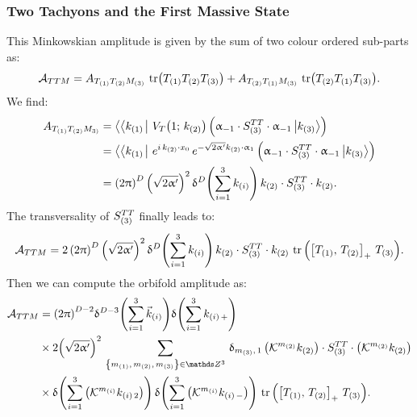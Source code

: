 \subsubsection{Two Tachyons and the First Massive State}

This Minkowskian amplitude is given by the sum of two colour ordered sub-parts as:
\begin{equation}
  \mathcal{A}_{TTM}
  =
  A_{T_{\qty(1)} T_{\qty(2)} M_{\qty(3)}}\,
  \tr(T_{\qty(1)} T_{\qty(2)} T_{\qty(3)})
  +
  A_{T_{\qty(2)} T_{\qty(1)} M_{\qty(3)}}\,
  \tr(T_{\qty(2)} T_{\qty(1)} T_{\qty(3)}).
\end{equation}
We find:
\begin{equation}
  \begin{split}
    A_{T_{\qty(1)} T_{\qty(2)} M_{3)}}
    & =
    \left\langle\left\langle k_{\qty(1)} \right.\right|\,
    V_T\qty(1;\, k_{\qty(2)})\,
    \qty(%
      \alpha_{-1} \cdot S_{\qty(3)}^{TT} \cdot \alpha_{-1} \ket{k_{\qty(3)}}
    )
    \\
    & =
    \left\langle\left\langle k_{\qty(1)} \right.\right|\,
    e^{i\, k_{\qty(2)} \cdot x_0}\,
    e^{-\sqrt{2 \ap} k_{\qty(2)} \cdot \alpha_{1}}\,
    \qty(%
      \alpha_{-1} \cdot S_{\qty(3)}^{TT} \cdot \alpha_{-1} \ket{k_{\qty(3)}}
    )
    \\
    & =
    \qty(2\pi)^D\,
    \qty(\sqrt{2 \ap})^2\,
    \delta^D\qty(\finitesum{i}{1}{3} k_{\qty(i)} )\,
    k_{\qty(2)} \cdot S_{\qty(3)}^{TT} \cdot k_{\qty(2)}.
  \end{split}
\end{equation}
The transversality of $S_{\qty(3)}^{TT}$ finally leads to:
\begin{equation}
  \mathcal{A}_{TTM}
  =
  2\,
  \qty(2\uppi)^D\,
  \qty(\sqrt{2 \upalpha'})^2\,
  \updelta^D\qty( \sum\limits_{i = 1}^{3} k_{\qty(i)} )\,
  k_{\qty(2)} \cdot S_{\qty(3)}^{TT} \cdot k_{\qty(2)}\,
  \tr\qty( \left[ T_{\qty(1)},\, T_{\qty(2)} \right]_+\, T_{\qty(3)} ).
\end{equation}
Then we can compute the orbifold amplitude as:
\begin{equation}
  \begin{split}
    \cA_{TTM}
    & =
    \qty(2\pi)^{D-2}
    \delta^{D-3}\qty( \finitesum{i}{1}{3} \vec{k}_{\qty(i)} )
    \delta\qty( \finitesum{i}{1}{3} k_{\qty(i)\, +} )
    \\
    & \times
    2 \qty(\sqrt{2 \ap})^2\,
    \sum_{ \qty{m_{\qty(1)},\, m_{\qty(2)},\, m_{\qty(3)}} \in \Z^3 }\,
    \delta_{m_{\qty(3)},\, 1}\,
    \qty(\cK^{m_{\qty(2)}} k_{\qty(2)})
    \cdot
    S_{\qty(3)}^{TT}
    \cdot
    \qty(\cK^{m_{\qty(2)}} k_{\qty(2)})
    \\
    & \times
    \delta\qty( \finitesum{i}{1}{3} \qty(\cK^{m_{\qty(i)}} k_{\qty(i)\, 2}) )\,
    \delta\qty( \finitesum{i}{1}{3} \qty(\cK^{m_{\qty(i)}} k_{\qty(i)\, -}) )\,
    \tr\qty( \liebraket{T_{\qty(1)}}{T_{\qty(2)}}_+\, T_{\qty(3)} ).
  \end{split}
\end{equation}
